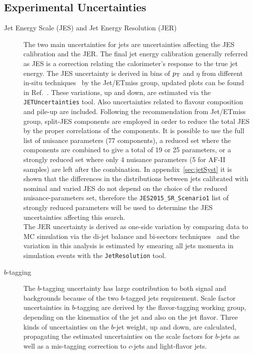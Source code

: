 \subsection{Experimental Uncertainties}
\label{sec:ExpSystematics}
\begin{description}
\item[Jet Energy Scale (JES) and Jet Energy Resolution (JER)] The two
  main uncertainties for jets are uncertainties affecting the JES
  calibration and the JER. The final jet
  energy calibration generally referred as JES is a correction
  relating the calorimeter's response to the true jet energy. The JES
  uncertainty is derived in bins of $p_{\rm T}$ and $\eta$ from different in-situ techniques~\cite{JESnew} by the
Jet/ETmiss group, updated plots can be found in Ref.~\cite{JES2015plots}. These variations, up and down, are estimated via the {\tt JETUncertainties} tool. Also uncertainties related to flavour composition and pile-up are included. Following the recommendation from Jet/ETmiss group, split-JES
components are employed in order to reduce the total JES by the
proper correlations of the components. It is possible to use the full list of nuisance parameters (77 components), a reduced set where the components are combined to give a total of 19 or 25 parameters, or a strongly reduced set where only 4 nuisance parameters (5 for AF-II samples) are left after the combination. In appendix~\ref{sec:jetSyst} it is shown that the differences in the distributions between jets calibrated with nominal and varied JES do not depend on the choice of the reduced nuisance-parameters set, therefore the {\tt JES2015\_SR\_Scenario1} list of strongly reduced parameters will be used to determine the JES uncertainties affecting this search.\\
The JER uncertainty is derived as one-side variation by comparing data to MC simulation via
the di-jet balance and bi-sectors techniques~\cite{JER} and the
variation in this analysis is estimated by smearing all jets momenta in simulation events with the
{\tt JetResolution} tool.
\item[$b$-tagging] The $b$-tagging uncertainty has large contribution
  to both signal and backgrounds because of the two
  $b$-tagged jets requirement. Scale factor uncertainties in $b$-tagging are
  derived by the flavor-tagging working group, depending on the
  kinematics of the jet and also on the jet flavor. Three kinds of uncertainties on the $b$-jet
weight, up and down, are calculated, propagating the estimated uncertainties on the scale factors for $b$-jets as well as a mis-tagging correction to $c$-jets and light-flavor jets.  

\end{description}
